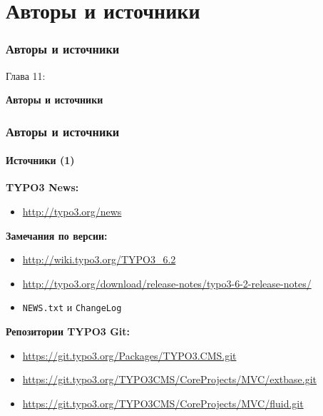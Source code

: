 %

\section{Авторы и источники}
\begin{frame}[fragile]
	\frametitle{Авторы и источники}

	\begin{center}\huge{Глава 11:}\end{center}
	\begin{center}\huge{\color{typo3darkgrey}\textbf{Авторы и источники}}\end{center}

\end{frame}


\begin{frame}[fragile]
	\frametitle{Авторы и источники}
	\framesubtitle{Источники (1)}

	\textbf{TYPO3 News:}
		\begin{itemize}\smaller
			\item \url{http://typo3.org/news}
		\end{itemize}

	\textbf{Замечания по версии:}
		\begin{itemize}\smaller
			\item \url{http://wiki.typo3.org/TYPO3_6.2}
			\item \url{http://typo3.org/download/release-notes/typo3-6-2-release-notes/}
			\item \texttt{NEWS.txt} и \texttt{ChangeLog}
		\end{itemize}

	\textbf{Репозитории TYPO3 Git:}
		\begin{itemize}\smaller
			\item \url{https://git.typo3.org/Packages/TYPO3.CMS.git}
			\item \url{https://git.typo3.org/TYPO3CMS/CoreProjects/MVC/extbase.git}
			\item \url{https://git.typo3.org/TYPO3CMS/CoreProjects/MVC/fluid.git}
		\end{itemize}

\end{frame}

